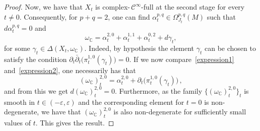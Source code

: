 \documentclass[a4paper]{amsart}
\theoremstyle{definition}
\theoremstyle{remark}
\numberwithin{equation}{section}
\begin{document}
\begin{proof}
Now, we have that $X_t$ is complex-\,$\mathcal C^{\infty}$-full at the second stage for every $t\neq 0$. Consequently, 
for $p+q=2$, one can find $\alpha_t^{p,q}\in\Omega_{J_t}^{p,q}(M)$ such that $d\alpha_t^{p,q}=0$ and
\begin{equation}\label{expression2}
\omega_{\mathbb C}=\alpha_t^{2,0}+\alpha_t^{1,1}+\alpha_t^{0,2}+d\gamma_t,
\end{equation}
for some $\gamma_t\in\Delta(X_t,\omega_{\mathbb C})$. Indeed, by hypothesis
the element $\gamma_t$ can be chosen to satisfy the condition 
$\partial_t\bar{\partial}_t\big(\pi_t^{1,0}(\gamma_t)\big)=0$. %
If we now compare~\eqref{expression1} and~\eqref{expression2}, one necessarily has that
\[
( \omega_{\mathbb C} )_t^{2,0}= \alpha_t^{2,0}+\partial_t\big(\pi_t^{1,0}(\gamma_t) \big)\,,
\]
and from this we get $d( \omega_{\mathbb C} )_t^{2,0}=0$. Furthermore, as 
the family $\big\{( \omega_{\mathbb C} )_t^{2,0}\big\}_t$ is smooth in 
$t\in(-\varepsilon,\varepsilon)$ and the corresponding element for $t=0$ is
non-degenerate, we have that $( \omega_{\mathbb C} )_t^{2,0}$ is also non-degenerate
for sufficiently small values of $t$. This gives the result.
\end{proof}
\end{document}
